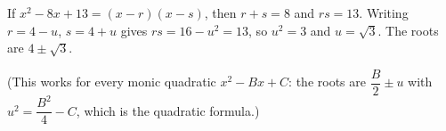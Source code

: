 If $x^2-8x+13=(x-r)(x-s)$, then $r+s=8$ and $rs=13$. Writing $r=4-u$, $s=4+u$ gives $rs=16-u^2=13$, so $u^2=3$ and $u=\sqrt3$. The roots are $\boxed{4\pm\sqrt3}$.

(This works for every monic quadratic $x^2-Bx+C$: the roots are $\dfrac B2\pm u$ with $u^2=\dfrac{B^2}4-C$, which is the quadratic formula.)
